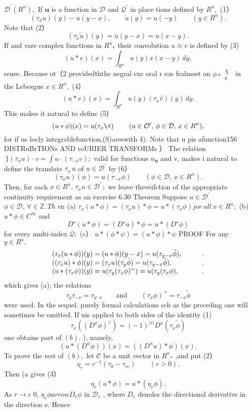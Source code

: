${\mathcal{D}}_{\cdot}^{\prime}(R^{n}),$ If ${\boldsymbol{u}}$ is a function in ${\mathcal{D}}$ and ${\mathcal{Q}}^{\prime}$ in place tions defined by $\textstyle R^{n}\!,$ (1） $$ (\tau_{x}u)(y)-u(y-x),\qquad\dot{u}(y)=u(-y)\qquad(y\in R^{n}). $$ Note that (2） $$ (\tau_{x}{\tilde{u}})(y)={\ddot{u}}(y-x)=u(x-y). $$ If and vare complex functions in $\textstyle R^{n}\!\!_{*}$ their convolution $u\approx v$ is defined by (3) $$ (u*v)(x)=\int_{R^{n}}u(y)x(x-y)\,d y, $$ sense. Because ot（2 providedththe negral exs oral r eas fralmost an $\phi\circ{\begin{array}{c}{\chi}\\ {\epsilon}\end{array}}\,$ in the Lebesgue $x\in R^{n},$ (4） $$ (u*v)(x)=\int_{R^{n}}u(y)(\tau_{x}\hat{v})(y)\,d y. $$ This makes it natural to definc (5） $$ (u*\phi)(x)=u(\tau_{x}\<)\;\;\;\;\;\;\;\;(u\in\mathcal{O}^{\prime},\,\phi\in\mathcal{D},\,x\in R^{n}), $$ for if us locly integrablefunction,(S)areswith 4). Note that u pis afunction156 DISTRuBrTIONs AND roURIER TRANSFORMs ） The relation $\ \}\left(\tau_{x}u\right)\cdot v=\textstyle\int u\cdot\left(\tau_{-x}v\right)\!\mathrm{;}$ valid for functions $u_{\textbf{u}}$ and v, makes i natural to define the translate $\tau_{x}\,u$ of $u\in{\mathcal{D}}^{\prime}$ by (6） $$ (\tau_{x}u)(\phi)=u(\tau_{-x}\phi)\qquad(\phi\in\mathcal{D},\,x\in R^{n}). $$ Then, for each $x\in R^{n},\,\tau_{x}u\in\mathcal{D}^{\prime}\,;$ we leave theveifction of the appropriate continuity requirement as an exercise 6.30 Theorem Suppose $u\in{\mathcal{D}}^{\prime}$ $\phi\in{\mathcal{D}},\,\forall\in\mathbb{Z}.\,T h$ en (a) $\tau_{x}(u*\phi)=(\tau_{x}u)*\phi=u*(\tau_{x}\phi)j o r\ a l l\ x\in R^{n};$ (b) $u*\phi\in C^{\infty}$ and $$ D^{\star}(u\ast\phi)=(D^{\star}u)\ast\phi=u\ast(D^{\star}\phi) $$ for every multi-index ${\mathcal{Q}};$ (c） $u*(\phi*\psi)=(u*\phi)*\psi$ PROOF For any $y\in R^{n},$ $$ \begin{array}{l l}{{(\tau_{x}(u*\phi))(y)=(u*\phi)(y-x)=u(\tau_{y-x}\tilde{\phi}),}}&{{\qquad.}}\\ {{((\tau_{x}u)*\phi)(y)=(\tau_{x}u)(\tau_{y}\tilde{\phi})=u(\tau_{y-x}\tilde{\phi}),}}&{{\qquad.}}\\ {{(u*(\tau_{x}\phi))(y)=u(\tau_{y}(\tau_{x}\phi)^{\sim})=u(\tau_{y}(\tau_{x}\phi),}}&{{\qquad.}}\end{array} $$ which gives (a); the relations $$ \tau_{y}\tau_{-x}=\tau_{y^{-}x}\qquad\mathrm{and}\qquad\left(\tau_{x}\phi\right)^{\ v}=\tau_{-x}\tilde{\phi} $$ were used. In the sequel. purely formal calculations sch as the preceding one will sometimes be omitted. If uis applicd to both sides of the identity (1) $$ \tau_{x}((D^{x}\phi)^{\vee})=(-\,1)^{|x|}D^{x}(\tau_{x}\tilde{\phi}) $$ one obtains part of $(b).$ ), namely, $$ (u\ast(D^{\alpha}\phi))(x)=((D^{\alpha}u)\ast\phi)(x). $$ To prove the rest of $(b),$ let $\scriptstyle{\mathcal{C}}$ be a unit vector in $\textstyle R^{n}\!\!_{*}$ ,and put (2） $$ \eta_{r}=r^{-1}(\tau_{0}-\tau_{r e})\qquad(r>0). $$ Then (a gives (3） $$ \eta_{r}(u\ast\phi)=u\ast(\eta_{r}\phi). $$ As $r\to c$ 0, $\eta_{r}\phi arrow D_{e}\phi$ in ${\mathcal{D}}_{s}$ , where $D_{e}$ denoles the directional derivative in the direction e. Hence $$ 
